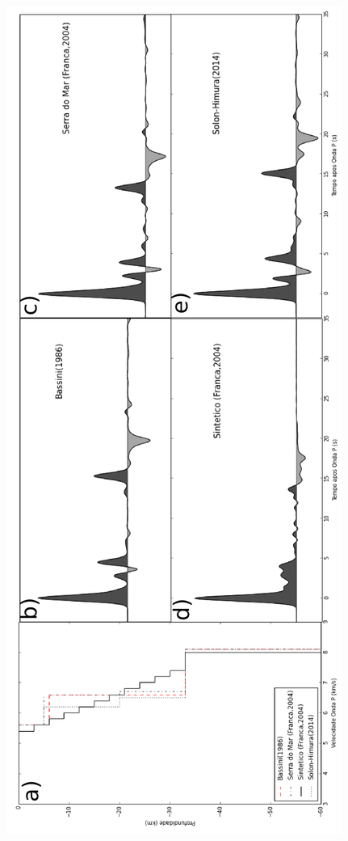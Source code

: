 \begin{figure}[!ht]
\centering
\includegraphics[scale=0.4]{modelagem_RF.png}
\caption{}
\label{modelagem}
\end{figure}


